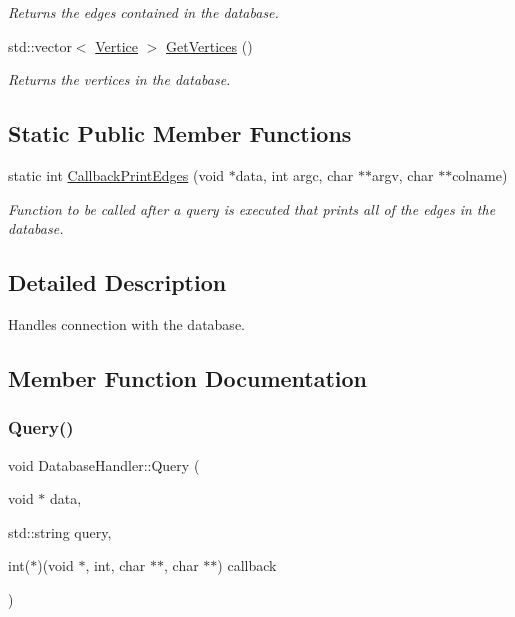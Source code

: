 \begin{DoxyCompactItemize}
\begin{DoxyCompactList}\small\item\em Returns the edges contained in the database. \end{DoxyCompactList}\item 
\mbox{\label{classDatabaseHandler_a380ac8cc0bd903de7e04b94e573bfe7e}} 
std\+::vector$<$ \hyperlink{classVertice}{Vertice} $>$ \hyperlink{classDatabaseHandler_a380ac8cc0bd903de7e04b94e573bfe7e}{Get\+Vertices} ()
\begin{DoxyCompactList}\small\item\em Returns the vertices in the database. \end{DoxyCompactList}\end{DoxyCompactItemize}
\subsection*{Static Public Member Functions}
\begin{DoxyCompactItemize}
\item 
\mbox{\label{classDatabaseHandler_aef050c7d4f8f945cb393b53b51aab185}} 
static int \hyperlink{classDatabaseHandler_aef050c7d4f8f945cb393b53b51aab185}{Callback\+Print\+Edges} (void $\ast$data, int argc, char $\ast$$\ast$argv, char $\ast$$\ast$colname)
\begin{DoxyCompactList}\small\item\em Function to be called after a query is executed that prints all of the edges in the database. \end{DoxyCompactList}\end{DoxyCompactItemize}


\subsection{Detailed Description}
Handles connection with the database. 

\subsection{Member Function Documentation}
\mbox{\label{classDatabaseHandler_ad6231ac1317c638424c66953bdd26ff0}} 
\subsubsection{\texorpdfstring{Query()}{Query()}}
{\footnotesize\ttfamily void Database\+Handler\+::\+Query (\begin{DoxyParamCaption}\item[{void $\ast$}]{data,  }\item[{std\+::string}]{query,  }\item[{int($\ast$)(void $\ast$, int, char $\ast$$\ast$, char $\ast$$\ast$)}]{callback }\end{DoxyParamCaption})}



